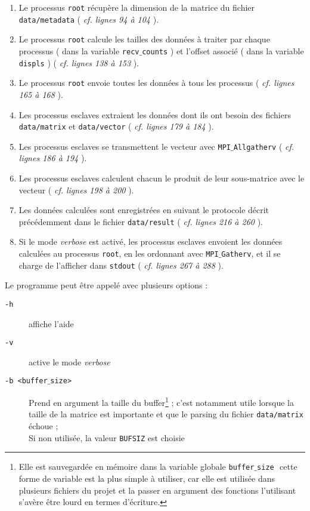 \documentclass[a4paper,10pt]{article}
\begin{document}
\begin{enumerate}
  \item Le processus \texttt{root} récupère la dimension de la matrice du fichier \texttt{data/metadata} ( \textit{cf. lignes 94 à 104} ).
  \item Le processus \texttt{root} calcule les tailles des données à traiter par chaque processus ( dans la variable \texttt{recv$\_$counts} ) et l'offset associé ( dans la variable \texttt{displs} ) ( \textit{cf. lignes 138 à 153} ).
  \item Le processus \texttt{root} envoie toutes les données à tous les processus  ( \textit{cf. lignes 165 à 168} ).
  \item Les processus esclaves extraient les données dont ils ont besoin des fichiers \texttt{data/matrix} et \texttt{data/vector} ( \textit{cf. lignes 179 à 184} ).
  \item Les processus esclaves se transmettent le vecteur avec \texttt{MPI$\_$Allgatherv} ( \textit{cf. lignes 186 à 194} ).
  \item Les processus esclaves calculent chacun le produit de leur sous-matrice avec le vecteur ( \textit{cf. lignes 198 à 200} ).
  \item Les données calculées sont enregistrées en suivant le protocole décrit précédemment dans le fichier \texttt{data/result} ( \textit{cf. lignes 216 à 260} ).
  \item Si le mode \textit{verbose} est activé, les processus esclaves envoient les données calculées au processus \texttt{root}, en les ordonnant avec \texttt{MPI$\_$Gatherv}, et il se charge de l'afficher dans \texttt{stdout} ( \textit{cf. lignes 267 à 288} ).
\end{enumerate}

\bigskip

Le programme peut être appelé avec plusieurs options :
\begin{description}
  \item[\texttt{-h}]affiche l'aide
  \item[\texttt{-v}]active le mode \textit{verbose}
  \item[\texttt{-b <buffer$\_$size>}]$ $\\Prend en argument la taille du buffer\footnote{Elle est sauvegardée en mémoire dans la variable globale \texttt{buffer$\_$size} \textemdash $ $ cette forme de variable est la plus simple à utiliser, car elle est utilisée dans plusieurs fichiers du projet et la passer en argument des fonctions l'utilisant s'avère être lourd en termes d'écriture.} ; c'est notamment utile lorsque la taille de la matrice est importante et que le parsing du fichier \texttt{data/matrix} échoue ;\\Si non utilisée, la valeur \texttt{BUFSIZ} est choisie
\end{description}
\end{document}
